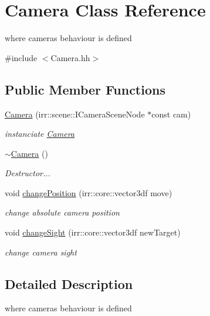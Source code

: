 \hypertarget{classCamera}{}\section{Camera Class Reference}
\label{classCamera}


where cameras behaviour is defined  




{\ttfamily \#include $<$Camera.\+hh$>$}

\subsection*{Public Member Functions}
\begin{DoxyCompactItemize}
\item 
\hyperlink{classCamera_a4ffc956956f49716d7fa3bff2591cd3a}{Camera} (irr\+::scene\+::\+I\+Camera\+Scene\+Node $\ast$const cam)
\begin{DoxyCompactList}\small\item\em instanciate \hyperlink{classCamera}{Camera} \end{DoxyCompactList}\item 
\mbox{\label{classCamera_ad1897942d0ccf91052386388a497349f}} 
\hyperlink{classCamera_ad1897942d0ccf91052386388a497349f}{$\sim$\+Camera} ()
\begin{DoxyCompactList}\small\item\em Destructor... \end{DoxyCompactList}\item 
void \hyperlink{classCamera_ad7d58a7f1ab2b31f120a0bdad677b300}{change\+Position} (irr\+::core\+::vector3df move)
\begin{DoxyCompactList}\small\item\em change absolute camera position \end{DoxyCompactList}\item 
void \hyperlink{classCamera_a8c11f289be05671191a4f91288155685}{change\+Sight} (irr\+::core\+::vector3df new\+Target)
\begin{DoxyCompactList}\small\item\em change camera sight \end{DoxyCompactList}\end{DoxyCompactItemize}


\subsection{Detailed Description}
where cameras behaviour is defined 

